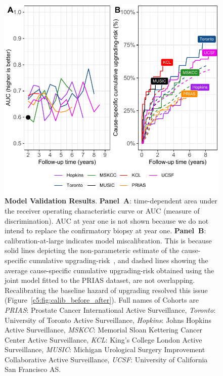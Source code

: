\begin{figure}
\centerline{\includegraphics{contents/c5/images/c5_fig4.pdf}}
\caption{\textbf{Model Validation Results}. \textbf{Panel~A}: time-dependent area under the receiver operating characteristic curve or AUC (measure of discrimination). AUC at year one is not shown because we do not intend to replace the confirmatory biopsy at year one. \textbf{Panel~B}: calibration-at-large indicates model miscalibration. This is because solid lines depicting the non-parameteric estimate of the cause-specific cumulative upgrading-risk~\citep{turnbull1976empirical}, and dashed lines showing the average cause-specific cumulative upgrading-risk obtained using the joint model fitted to the PRIAS dataset, are not overlapping. Recalibrating the baseline hazard of upgrading resolved this issue (Figure~\ref{c5:fig:calib_before_after}). Full names of Cohorts are \textit{PRIAS}: Prostate Cancer International Active Surveillance, \textit{Toronto}: University of Toronto Active Surveillance, \textit{Hopkins}: Johns Hopkins Active Surveillance, \textit{MSKCC}: Memorial Sloan Kettering Cancer Center Active Surveillance, \textit{KCL}: King's College London Active Surveillance, \textit{MUSIC}: Michigan Urological Surgery Improvement Collaborative Active Surveillance, \textit{UCSF}: University of California San Francisco AS.}
\label{c5:fig:4}
\end{figure}

